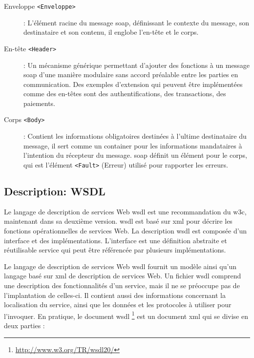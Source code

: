   \SpecialItem
  \renewcommand{\descriptionlabel}[1]{\hspace{1cm}\texttt{#1}}
  \begin{description}
  \item[Enveloppe \texttt{<Enveloppe>}]: L'élément racine du message
    \acrshort{soap}, définissant le contexte du message, son
    destinataire et son contenu, il englobe l'en-tête et le corps.

  \item[En-tête \texttt{<Header>}]: Un mécanisme générique permettant
    d'ajouter des fonctions à un message \acrshort{soap} d'une manière
    modulaire sans accord préalable entre les parties en
    communication.  Des exemples d'extension qui peuvent être
    implémentées comme des en-têtes sont des authentifications, des
    transactions, des paiements.

  \item[Corps \texttt{<Body>}]: Contient les informations obligatoires
    destinées à l'ultime destinataire du message, il sert comme un
    container pour les informations mandataires à l'intention du
    récepteur du message. \acrshort{soap} définit un élément pour le
    corps, qui est l'élément \texttt{<Fault>} (Erreur) utilisé pour
    rapporter les erreurs.
  \end{description}
  \enddescription

  \subsection{Description: WSDL}
  \label{sec:wsdl}

  Le langage de description de services Web \acrshort{wsdl}
  \cite{christensen2001web, chinnici2007web} est une recommandation du
  \acrshort{w3c}, maintenant dans sa deuxième version.
  \acrshort{wsdl} est basé sur \acrshort{xml} pour décrire les
  fonctions opérationnelles de services Web. La description
  \acrshort{wsdl} est composée d'un interface et des
  implémentations. L'interface est une définition abstraite et
  réutilisable service qui peut être référencée par plusieurs
  implémentations.\medskip

  Le langage de description de services Web \acrshort{wsdl}
  \cite{chinnici2007web} fournit un modèle ainsi qu'un langage basé
  sur \acrshort{xml} de description de services Web. Un fichier
  \acrshort{wsdl} comprend une description des fonctionnalités d'un
  service, mais il ne se préoccupe pas de l'implantation de celles-ci.
  Il contient aussi des informations concernant la localisation du
  service, ainsi que les données et les protocoles à utiliser pour
  l'invoquer. En pratique, le document \acrshort{wsdl}
  \footnote{\url{http://www.w3.org/TR/wsdl20/}} est un document
  \acrshort{xml} qui se divise en deux parties \cite{elie2010} :

